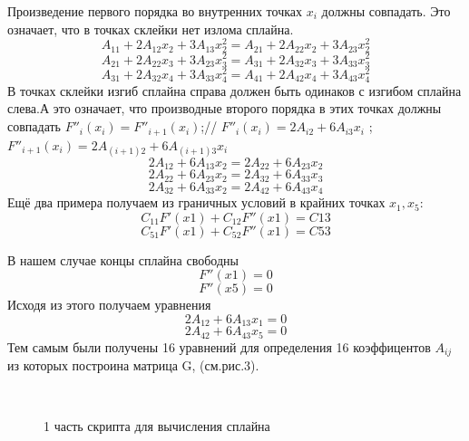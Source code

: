 \documentclass[russian,utf8,nocolumnxxxi,nocolumnxxxii]{eskdtext}
\begin{document}
Произведение первого порядка во внутренних точках $x_i$ должны совпадать. Это означает, что в точках склейки нет излома сплайна.
$$A_{11}+2A_{12}x_2+3A_{13}x_2^2=A_{21}+2A_{22}x_2+3A_{23}x_2^2$$
$$A_{21}+2A_{22}x_3+3A_{23}x_3^2=A_{31}+2A_{32}x_3+3A_{33}x_3^2$$
$$A_{31}+2A_{32}x_4+3A_{33}x_4^2=A_{41}+2A_{42}x_4+3A_{43}x_4^2$$
В точках склейки изгиб сплайна справа должен быть одинаков с изгибом сплайна слева.А это означает, что производные второго порядка в этих точках должны совпадать $F''_i(x_i)=F''_{i+1}(x_i)$;//
$F''_i(x_i)=2A_{i2}+6A_{i3}x_i $ ;   $F''_{i+1}(x_i)=2A_{(i+1)2}+6A_{(i+1)3}x_i$
$$2A_{12}+6A_{13}x_2=2A_{22}+6A_{23}x_2$$
$$2A_{22}+6A_{23}x_2=2A_{32}+6A_{33}x_3$$
$$2A_{32}+6A_{33}x_2=2A_{42}+6A_{43}x_4$$
Ещё два примера получаем из граничных условий в крайних точках $x_1,x_5$:
$$C_{11}F'(x1)+C_{12}F''(x1)=C13$$
$$C_{51}F'(x1)+C_{52}F''(x1)=C53$$

В нашем случае концы сплайна свободны
$$F''(x1)=0$$
$$F''(x5)=0$$
Исходя из этого получаем уравнения
$$2A_{12}+6A_{13}x_1=0$$
$$2A_{42}+6A_{43}x_5=0$$
Тем самым были получены 16 уравнений для определения 16 коэффицентов $A_{ij}$
из которых построина матрица G, (см.рис.3).

\begin{figure}[H]
 \\
\caption{1 часть скрипта для вычисления сплайна}
\end{figure}
\end{document}
